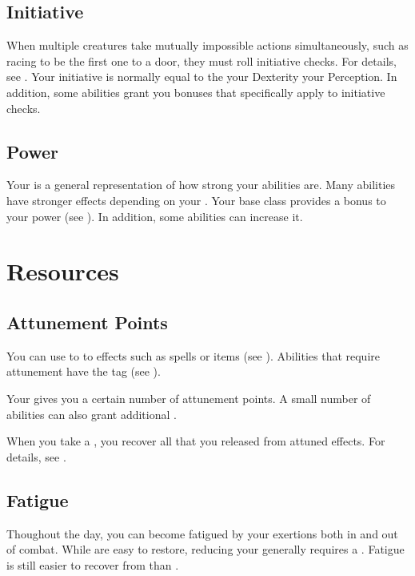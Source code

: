     \subsection{Initiative}\label{Initiative}
        When multiple creatures take mutually impossible actions simultaneously, such as racing to be the first one to a door, they must roll initiative checks.
        For details, see .
        Your initiative is normally equal to the your Dexterity \add your Perception.
        In addition, some abilities grant you bonuses that specifically apply to initiative checks.

    \subsection{Power}\label{Power}
        Your  is a general representation of how strong your abilities are.
        Many abilities have stronger effects depending on your .
        Your base class provides a bonus to your power (see ).
        In addition, some abilities can increase it.

\section{Resources}\label{Resources}

    \subsection{Attunement Points}\label{Attunement Points}
        You can use  to  to effects such as spells or items (see ).
        Abilities that require attunement have the  tag (see ).

        Your  gives you a certain number of attunement points.
        A small number of abilities can also grant additional .

        When you take a , you recover all  that you released from attuned effects.
        For details, see .

    \subsection{Fatigue}\label{Fatigue}
        Thoughout the day, you can become fatigued by your exertions both in and out of combat.
        While  are easy to restore, reducing your  generally requires a .
        Fatigue is still easier to recover from than .

